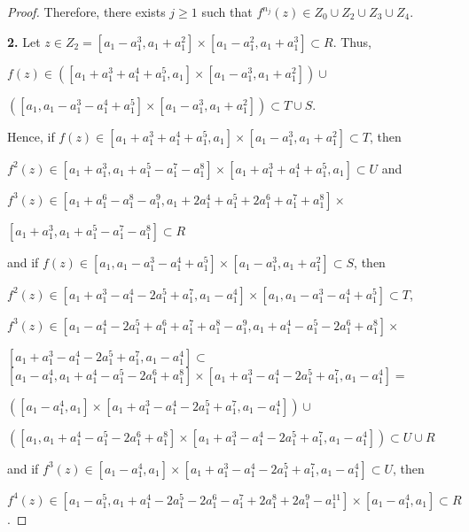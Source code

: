 \documentclass[11pt]{amsart}
\theoremstyle{definition}
\begin{document}
\begin{proof}
	Therefore,  there exists $j\geq 1$ such that $f^{n_j}(z)\in Z_0\cup Z_2\cup Z_3\cup Z_4$.


\smallskip

\textbf{2.} Let $z\in Z_2=[a_1-a_1^3,a_1+a_1^2]\times[a_1-a_1^2,a_1+a_1^3]\subset R$. Thus,

\smallskip

\noindent $f(z)\in ( [a_1+a_1^3+a_1^4+a_1^5, a_1]\times[a_1-a_1^3,a_1+a_1^2]) \cup$

\hfill $( [a_1, a_1-a_1^3-a_1^4+a_1^5]\times [a_1-a_1^3,a_1+a_1^2])\subset T\cup S$.

\smallskip

Hence, if $f(z)\in [a_1+a_1^3+a_1^4+a_1^5, a_1]\times[a_1-a_1^3,a_1+a_1^2] \subset T$, then

\smallskip

\noindent $f^2(z)\in [a_1+a_1^3,a_1+a_1^5-a_1^7-a_1^8]\times[a_1+a_1^3+a_1^4+a_1^5,a_1] \subset U$ and

\noindent $f^3(z)\in [a_1+a_1^6-a_1^8-a_1^9,a_1+2a_1^4+a_1^5+2a_1^6+a_1^7+a_1^8]\times$ 

\hfill $[a_1+a_1^3,a_1+a_1^5-a_1^7-a_1^8]\subset R$

\smallskip

\noindent and if $f(z)\in [a_1, a_1-a_1^3-a_1^4+a_1^5]\times [a_1-a_1^3,a_1+a_1^2] \subset S$, then

\smallskip

\noindent $f^2(z)\in [a_1+a_1^3-a_1^4-2a_1^5+a_1^7,a_1-a_1^4]\times[a_1,a_1-a_1^3-a_1^4+a_1^5] \subset T $,

\smallskip

\noindent $f^3(z)\in [a_1-a_1^4-2a_1^5+a_1^6+a_1^7+a_1^8-a_1^9,a_1+a_1^4-a_1^5-2a_1^6+a_1^8]\times$

\hfill $[a_1+a_1^3-a_1^4-2a_1^5+a_1^7,a_1-a_1^4]\subset$
$ [a_1-a_1^4,a_1+a_1^4-a_1^5-2a_1^6+a_1^8]\times[a_1+a_1^3-a_1^4-2a_1^5+a_1^7,a_1-a_1^4]=$

\smallskip

\noindent $([a_1-a_1^4,a_1]\times[a_1+a_1^3-a_1^4-2a_1^5+a_1^7,a_1-a_1^4])\cup$

\hfill $([a_1,a_1+a_1^4-a_1^5-2a_1^6+a_1^8]\times[a_1+a_1^3-a_1^4-2a_1^5+a_1^7,a_1-a_1^4])\subset U\cup R$

\smallskip

\noindent and if $f^3(z)\in [a_1-a_1^4,a_1]\times[a_1+a_1^3-a_1^4-2a_1^5+a_1^7,a_1-a_1^4]\subset U$, then

\smallskip

\noindent $f^4(z)\in  [a_1-a_1^5,a_1+a_1^4-2a_1^5-2a_1^6-a_1^7+2a_1^8+2a_1^9-a_1^{11}] \times[a_1-a_1^4,a_1]\subset R$.


\end{proof}
\end{document}
